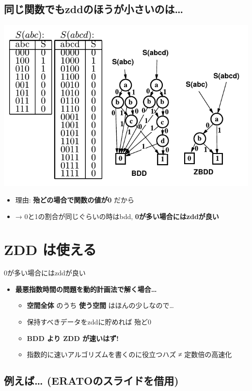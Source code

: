 \subsection{同じ関数でもzddのほうが小さいのは\ldots{}}
\label{sec-5-3}

\includegraphics{img/static/bdd-zdd2.png}

\begin{itemize}
\item 理由: \textbf{殆どの場合で関数の値が0} だから
\item → 0と1の割合が同じぐらいの時はbdd, \textbf{0が多い場合にはzddが良い}
\end{itemize}

\section{ZDD は使える}
\label{sec-6}

0が多い場合にはzddが良い

\begin{itemize}
\item \textbf{最悪指数時間の問題を動的計画法で解く場合…}
\begin{itemize}
\item \textbf{空間全体} のうち \textbf{使う空間} はほんの少しなので…
\item 保持すべきデータをzddに貯めれば 殆ど0
\item \textbf{BDD より ZDD が速いはず!}
\item 指数的に速いアルゴリズムを書くのに役立つハズ ≠ 定数倍の高速化
\end{itemize}
\end{itemize}

\subsection{例えば\ldots{} (ERATOのスライドを借用)}
\label{sec-6-1}

